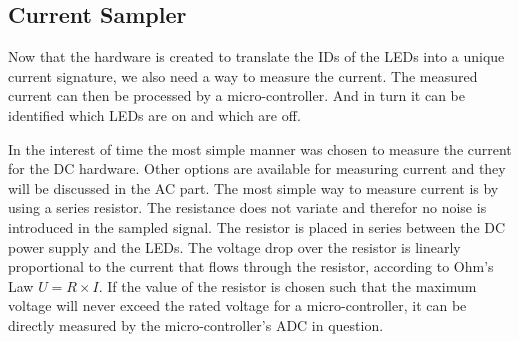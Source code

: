 
 \subsection{Current Sampler}

	Now that the hardware is created to translate the IDs of the LEDs into a unique current signature, we also need a way to measure the current.
	The measured current can then be processed by a micro-controller.
	And in turn it can be identified which LEDs are on and which are off.

	In the interest of time the most simple manner was chosen to measure the current for the DC hardware.
	Other options are available for measuring current and they will be discussed in the AC part.
	The most simple way to measure current is by using a series resistor.
	The resistance does not variate and therefor no noise is introduced in the sampled signal.
	The resistor is placed in series between the DC power supply and the LEDs.
	The voltage drop over the resistor is linearly proportional to the current that flows through the resistor, according to Ohm's Law $U = R \times I$.
	If the value of the resistor is chosen such that the maximum voltage will never exceed the rated voltage for a micro-controller, it can be directly measured by the micro-controller's ADC in question.